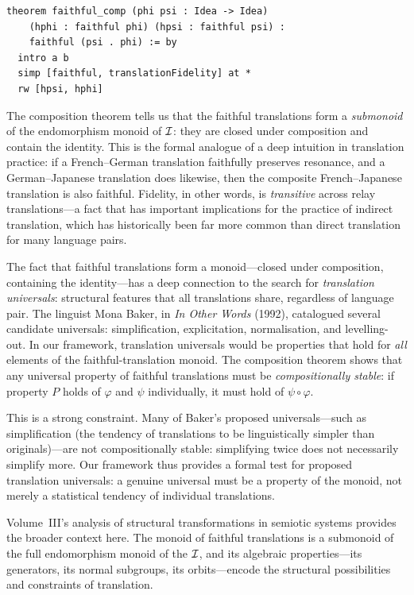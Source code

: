 \begin{lstlisting}
theorem faithful_comp (phi psi : Idea -> Idea)
    (hphi : faithful phi) (hpsi : faithful psi) :
    faithful (psi . phi) := by
  intro a b
  simp [faithful, translationFidelity] at *
  rw [hpsi, hphi]
\end{lstlisting}

\begin{interpretation}
\label{int:faithful-monoid}
The composition theorem tells us that the faithful translations form a
\emph{submonoid} of the endomorphism monoid of $\mathcal{I}$: they are closed under
composition and contain the identity.  This is the formal analogue of a
deep intuition in translation practice: if a French--German translation
faithfully preserves resonance, and a German--Japanese translation does
likewise, then the composite French--Japanese translation is also faithful.
Fidelity, in other words, is \emph{transitive} across relay translations---a
fact that has important implications for the practice of indirect translation,
which has historically been far more common than direct translation for
many language pairs.
\end{interpretation}

\begin{interpretation}
\label{interp:monoid-universals}
The fact that faithful translations form a monoid---closed under composition, containing the identity---has a deep connection to the search for \emph{translation universals}: structural features that all translations share, regardless of language pair.  The linguist Mona Baker, in \textit{In Other Words} (1992), catalogued several candidate universals: simplification, explicitation, normalisation, and levelling-out.  In our framework, translation universals would be properties that hold for \emph{all} elements of the faithful-translation monoid.  The composition theorem shows that any universal property of faithful translations must be \emph{compositionally stable}: if property $P$ holds of $\varphi$ and $\psi$ individually, it must hold of $\psi \circ \varphi$.

This is a strong constraint.  Many of Baker's proposed universals---such as simplification (the tendency of translations to be linguistically simpler than originals)---are not compositionally stable: simplifying twice does not necessarily simplify more.  Our framework thus provides a formal test for proposed translation universals: a genuine universal must be a property of the monoid, not merely a statistical tendency of individual translations.

Volume~III's analysis of structural transformations in semiotic systems provides the broader context here.  The monoid of faithful translations is a submonoid of the full endomorphism monoid of the $\mathcal{I}$, and its algebraic properties---its generators, its normal subgroups, its orbits---encode the structural possibilities and constraints of translation.
\end{interpretation}

